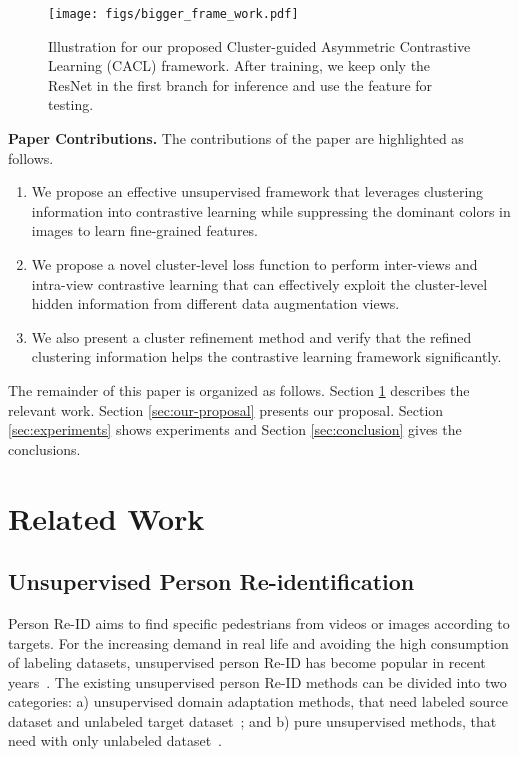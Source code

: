 \documentclass[journal]{IEEEtran}
\newcommand{\myparagraph}[1]{\noindent\textbf{#1.}}
\begin{document}
\begin{figure*}[!htb]
\begin{center}
\texttt{[image: figs/bigger\_frame\_work.pdf]}
\caption{Illustration for our proposed Cluster-guided Asymmetric Contrastive Learning (CACL) framework. After training, we keep only the ResNet  in the first branch for inference and use the feature  for testing.  }
\label{fig:CACL}
 \end{center}
\end{figure*}










\myparagraph{Paper Contributions} 
The contributions of the paper are highlighted as follows. 
\begin{enumerate}


\item 

We propose an effective unsupervised framework that leverages clustering information into contrastive learning while suppressing the dominant colors in images to learn fine-grained features. 
 



\item  

We propose a novel cluster-level loss function to perform inter-views and intra-view contrastive learning that can effectively exploit the cluster-level hidden information from different data augmentation views. 


\item We also present a cluster refinement method and verify that the refined clustering information helps the contrastive learning framework significantly. 
 

\end{enumerate}

The remainder of this paper is organized as follows. Section \ref{sec:related-work} describes the relevant work. Section \ref{sec:our-proposal} presents our proposal. Section \ref{sec:experiments} shows experiments and Section \ref{sec:conclusion} gives the conclusions.


\section{Related Work}
\label{sec:related-work}
\subsection{Unsupervised Person Re-identification}
Person Re-ID aims to find specific pedestrians from videos or images according to targets. 
For the increasing demand in real life and avoiding the high consumption of labeling datasets, unsupervised person Re-ID has become popular in recent years~\cite{Zheng:arXiv16}.  
The existing unsupervised person Re-ID methods can be divided into two categories: a) unsupervised domain adaptation methods, that need labeled source dataset and unlabeled target dataset~\cite{liu:CVPR19,Bak:ECCV18,Peng:CVPR16,Wang:CVPR18}; and b) pure unsupervised methods, that need with only unlabeled dataset~\cite{Ge:NIPS20,Lin:AAAI19,Fan:TOMM18,Lin:CVPR20}. 
\end{document}

